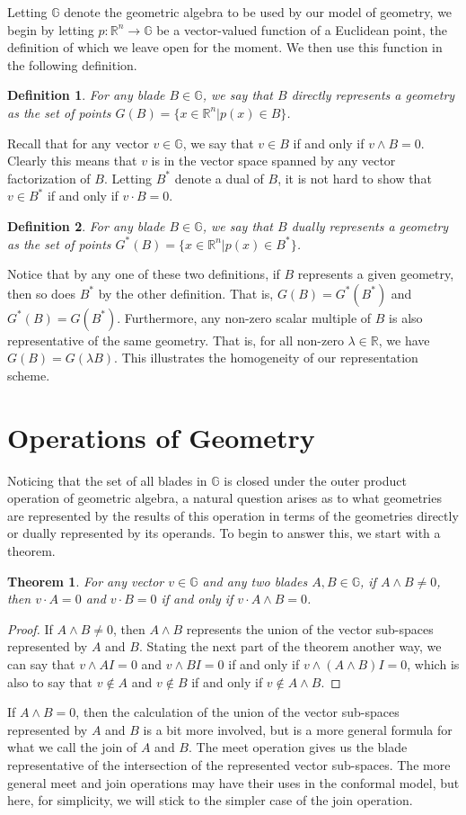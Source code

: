 \documentclass[12pt]{article}
\newcommand{\G}{\mathbb{G}}
\newcommand{\R}{\mathbb{R}}
\newtheorem{theorem}{Theorem}[section]
\newtheorem{definition}{Definition}[section]
\begin{document}
Letting $\G$ denote the geometric algebra to be used by our model
of geometry, we begin by letting $p:\R^n\to\G$ be a vector-valued
function of a Euclidean point, the definition of which we leave
open for the moment.  We then use this function in the following definition.
\begin{definition}\label{def_direct_rep}
For any blade $B\in\G$, we say that $B$ directly
represents a geometry as the set of points
$G(B)=\{x\in\R^n|p(x)\in B\}$.
\end{definition}
Recall that for any vector $v\in\G$, we say that $v\in B$ if and only if $v\wedge B=0$.
Clearly this means that $v$ is in the vector space spanned by any vector factorization
of $B$.  Letting $B^*$ denote a dual of $B$, it is not hard to show that
$v\in B^*$ if and only if $v\cdot B=0$.
\begin{definition}\label{def_dual_rep}
For any blade $B\in\G$, we say that $B$ dually
represents a geometry as the set of points
$G^*(B)=\{x\in\R^n|p(x)\in B^*\}$.
\end{definition}
Notice that by any one of these two definitions, if $B$ represents
a given geometry, then so does $B^*$ by the other definition.
That is, $G(B)=G^*(B^*)$ and $G^*(B)=G(B^*)$.
Furthermore, any non-zero scalar multiple of $B$ is also representative
of the same geometry.  That is, for all non-zero $\lambda\in\R$,
we have $G(B)=G(\lambda B)$.  This illustrates the homogeneity of
our representation scheme.

\section{Operations of Geometry}

Noticing that the set of all blades in $\G$ is closed under the
outer product operation of geometric algebra,
a natural question arises as to what geometries are represented
by the results of this operation in terms of
the geometries directly or dually represented by its operands.  To begin to answer this,
we start with a theorem.
\begin{theorem}\label{thm_intersect}
For any vector $v\in\G$ and any two blades $A,B\in\G$,
if $A\wedge B\neq 0$, then $v\cdot A=0$ and $v\cdot B=0$ if and only if $v\cdot A\wedge B=0$.
\end{theorem}
\begin{proof}
If $A\wedge B\neq 0$, then $A\wedge B$ represents the union of the vector sub-spaces
represented by $A$ and $B$.  Stating the next part of the theorem another way, we can
say that $v\wedge AI=0$ and $v\wedge BI=0$ if and only if $v\wedge (A\wedge B)I=0$,
which is also to say that $v\not\in A$ and $v\not\in B$ if and only if $v\not\in A\wedge B$.
\end{proof}
If $A\wedge B=0$, then the calculation of the union of the vector sub-spaces represented by
$A$ and $B$ is a bit more involved, but is a more general formula for what we call the join
of $A$ and $B$.  The meet operation gives us the blade representative of the intersection
of the represented vector sub-spaces. The more general meet and join
operations may have their uses in the conformal model, but here, for simplicity, we will stick to the
simpler case of the join operation.
\end{document}

